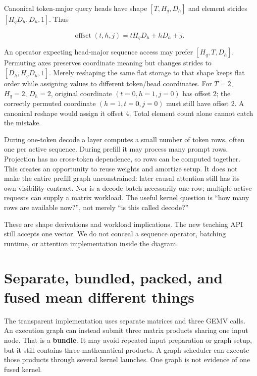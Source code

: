 Canonical token-major query heads have shape \([T,H_q,D_h]\) and element
strides \([H_qD_h,D_h,1]\). Thus

\begin{equation}
\operatorname{offset}(t,h,j)=tH_qD_h+hD_h+j.
\end{equation}

An operator expecting head-major sequence access may prefer
\([H_q,T,D_h]\). Permuting axes preserves coordinate meaning but changes
strides to \([D_h,H_qD_h,1]\). Merely reshaping the same flat storage to
that shape keeps flat order while assigning values to different
token/head coordinates. For \(T=2\), \(H_q=2\), \(D_h=2\), original
coordinate \((t=0,h=1,j=0)\) has offset 2; the correctly permuted
coordinate \((h=1,t=0,j=0)\) must still have offset 2. A canonical
reshape would assign it offset 4. Total element count alone cannot catch
the mistake.

During one-token decode a layer computes a small number of token rows,
often one per active sequence. During prefill it may process many prompt
rows. Projection has no cross-token dependence, so rows can be computed
together. This creates an opportunity to reuse weights and amortize
setup. It does not make the entire prefill graph unconstrained: later
causal attention still has its own visibility contract. Nor is a decode
batch necessarily one row; multiple active requests can supply a matrix
workload. The useful kernel question is ``how many rows are available
now?'', not merely ``is this called decode?''

These are shape derivations and workload implications. The new teaching
API still accepts one vector. We do not conceal a sequence operator,
batching runtime, or attention implementation inside the diagram.

\section{Separate, bundled, packed, and fused mean different
things}\label{separate-bundled-packed-and-fused-mean-different-things}


The transparent implementation uses separate matrices and three GEMV
calls. An execution graph can instead submit three matrix products
sharing one input node. That is a \textbf{bundle}. It may avoid repeated
input preparation or graph setup, but it still contains three
mathematical products. A graph scheduler can execute those products
through several kernel launches. One graph is not evidence of one fused
kernel.

